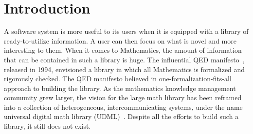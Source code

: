 \chapter{Introduction}



A software system is more useful to its users when it is equipped with a library of ready-to-utilize information. A user can then focus on what is novel and more interesting to them. When it comes to Mathematics, the amount of information that can be contained in such a library is huge. The influential QED manifesto~\cite{boyer1994qed}, released in 1994, envisioned a library in which all Mathematics is formalized and rigorously checked. The QED manifesto believed in one-formalization-fits-all approach to building the library. 
As the mathematics knowledge management community grew larger, the vision for the large math library has been reframed into a collection of heterogeneous, intercommunicating systems, under the name universal digital math library (UDML)~\cite{farmer2004mkm}. Despite all the efforts to build such a library, it still does not exist. 



